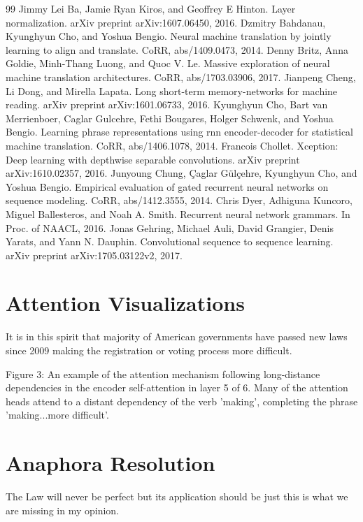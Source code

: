 \documentclass[conference]{IEEEtran}
\begin{document}
\begin{thebibliography}{99}
 Jimmy Lei Ba, Jamie Ryan Kiros, and Geoffrey E Hinton. Layer normalization. arXiv preprint arXiv:1607.06450, 2016.
 Dzmitry Bahdanau, Kyunghyun Cho, and Yoshua Bengio. Neural machine translation by jointly learning to align and translate. CoRR, abs/1409.0473, 2014.
 Denny Britz, Anna Goldie, Minh-Thang Luong, and Quoc V. Le. Massive exploration of neural machine translation architectures. CoRR, abs/1703.03906, 2017.
 Jianpeng Cheng, Li Dong, and Mirella Lapata. Long short-term memory-networks for machine reading. arXiv preprint arXiv:1601.06733, 2016.
 Kyunghyun Cho, Bart van Merrienboer, Caglar Gulcehre, Fethi Bougares, Holger Schwenk, and Yoshua Bengio. Learning phrase representations using rnn encoder-decoder for statistical machine translation. CoRR, abs/1406.1078, 2014.
 Francois Chollet. Xception: Deep learning with depthwise separable convolutions. arXiv preprint arXiv:1610.02357, 2016.
 Junyoung Chung, Çaglar Gülçehre, Kyunghyun Cho, and Yoshua Bengio. Empirical evaluation of gated recurrent neural networks on sequence modeling. CoRR, abs/1412.3555, 2014.
 Chris Dyer, Adhiguna Kuncoro, Miguel Ballesteros, and Noah A. Smith. Recurrent neural network grammars. In Proc. of NAACL, 2016.
 Jonas Gehring, Michael Auli, David Grangier, Denis Yarats, and Yann N. Dauphin. Convolutional sequence to sequence learning. arXiv preprint arXiv:1705.03122v2, 2017.
\end{thebibliography}

\section{Attention Visualizations}
It is in this spirit that majority of American governments have passed new laws since 2009 making the registration or voting process more difficult.

Figure 3: An example of the attention mechanism following long-distance dependencies in the encoder self-attention in layer 5 of 6. Many of the attention heads attend to a distant dependency of the verb 'making', completing the phrase 'making...more difficult'. 

\section{Anaphora Resolution}
The Law will never be perfect but its application should be just this is what we are missing in my opinion.
\end{document}
